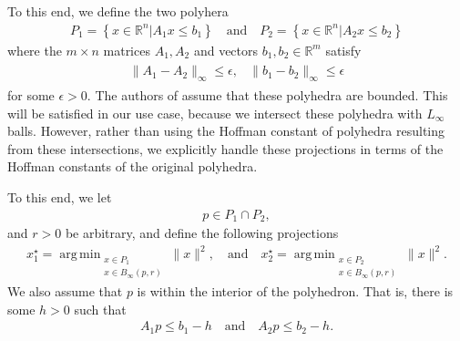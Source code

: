 \documentclass{article}
\theoremstyle{case}
\numberwithin{theorem}{subsection}
\DeclareMathOperator*{\argmin}{arg\,min}
\newcommand{\bpr}{{B_{\infty}\left(p, r\right)}}
\newcommand{\Rm}{\mathbb R^m}
\newcommand{\Rn}{\mathbb R^n}
\begin{document}
To this end, we define the two polyhera
\begin{align}
\label{bap_define_the_polyhedra}
P_1 = \left\{ x \in \Rn | A_1x\le b_1 \right\}
\quad \textrm{and} \quad
P_2 = \left\{ x \in \Rn | A_2x\le b_2 \right\}
\end{align}
where the $m\times n$ matrices $A_1, A_2$ and vectors $b_1, b_2 \in \Rm$ satisfy
\begin{align}
\begin{array}{cc}
\|A_1 - A_2\|_{\infty} \le \epsilon, & \|b_1 - b_2\|_{\infty} \le \epsilon
\label{bap_polyhedra_are_close}
\end{array}
\end{align}
for some $\epsilon > 0$.
The authors of \cite{continuity_of_metric_projections} assume that these polyhedra are bounded.
This will be satisfied in our use case, because we intersect these polyhedra with $L_{\infty}$ balls.
However, rather than using the Hoffman constant of polyhedra resulting from these intersections,
we explicitly handle these projections in terms of the Hoffman constants of the original polyhedra.

% 
% 
% 

To this end, we let 
\begin{align}
p \in P_1\cap P_2,
\label{bap_define_ps}
\end{align} and $r>0$ be arbitrary, 
and define the following projections
\begin{align}
x_1^{\star} = \argmin_{
\substack{x\in P_1 \\ x \in \bpr }
}\|x\|^2, 
\quad \textrm{and} \quad
x_2^{\star} = \argmin_{
\substack{x\in P_2 \\ x \in \bpr }
}\|x\|^2.
\label{bap_define_the_projections}
\end{align}
We also assume that $p$ is within the interior of the polyhedron.
That is, there is some $h > 0$ such that 
\begin{align}
\label{bap_feasible_by_h}
A_1 p \le b_1 - h
\quad \textrm{and} \quad
A_2 p \le b_2 - h.
\end{align}
\end{document}
